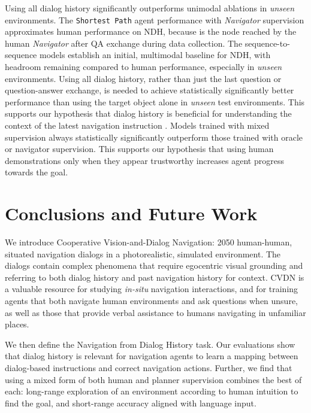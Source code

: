 \documentclass{article}
\newcommand{\datasetfull}{Cooperative Vision-and-Dialog Navigation}
\newcommand{\dataset}{CVDN}
\newcommand{\taskfull}{Navigation from Dialog History}
\newcommand{\task}{NDH}
\newcommand{\nav}{\textit{Navigator}}
\begin{document}
Using all dialog history significantly outperforms unimodal ablations in \textit{unseen} environments.
The \texttt{Shortest Path} agent performance with \nav{} supervision  approximates human performance on \task{}, because  is the node reached by the human \nav{} after QA exchange  during data collection.
The sequence-to-sequence models establish an initial, multimodal baseline for \task{}, with headroom remaining compared to human performance, especially in \textit{unseen} environments.
Using all dialog history, rather than just the last question or question-answer exchange, is needed to achieve statistically significantly better performance than using the target object alone in \textit{unseen} test environments.
This supports our hypothesis that dialog history is beneficial for understanding the context of the latest navigation instruction .
Models trained with mixed supervision always statistically significantly outperform those trained with oracle or navigator supervision.
This supports our hypothesis that using human demonstrations only when they appear trustworthy increases agent progress towards the goal.
 
\section{Conclusions and Future Work}
\label{sec:conclusion}

We introduce \datasetfull{}: 2050 human-human, situated navigation dialogs in a photorealistic, simulated environment.
The dialogs contain complex phenomena that require egocentric visual grounding and referring to both dialog history and past navigation history for context.
\dataset{} is a valuable resource for studying \textit{in-situ} navigation interactions, and for training agents that both navigate human environments and ask questions when unsure, as well as those that provide verbal assistance to humans navigating in unfamiliar places.

We then define the \taskfull{} task.
Our evaluations show that dialog history is relevant for navigation agents to learn a mapping between dialog-based instructions and correct navigation actions.
Further, we find that using a mixed form of both human and planner supervision combines the best of each: long-range exploration of an environment according to human intuition to find the goal, and short-range accuracy aligned with language input.
\end{document}
